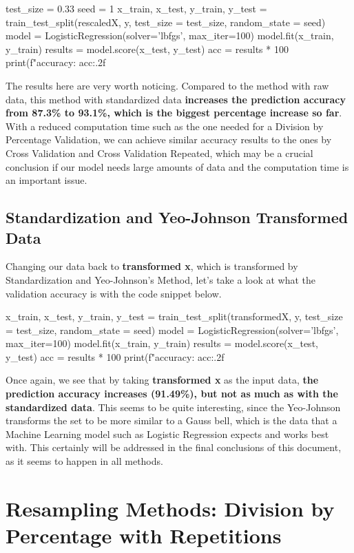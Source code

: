 \documentclass[11pt]{article}
\begin{document}
\begin{python}
test_size = 0.33
seed = 1
x_train, x_test, y_train, y_test = train_test_split(rescaledX, y, test_size = test_size, random_state = seed)
model = LogisticRegression(solver='lbfgs', max_iter=100)
model.fit(x_train, y_train)
results = model.score(x_test, y_test)
acc = results * 100
print(f"accuracy: {acc:.2f}%
\end{python}

The results here are very worth noticing. Compared to the method with raw data, this method with standardized data \textbf{increases the prediction accuracy from 87.3\% to 93.1\%, which is the biggest percentage increase so far}. With a reduced computation time such as the one needed for a Division by Percentage Validation, we can achieve similar accuracy results to the ones by Cross Validation and Cross Validation Repeated, which may be a crucial conclusion if our model needs large amounts of data and the computation time is an important issue.

\subsection{Standardization and Yeo-Johnson Transformed Data}

Changing our data back to \textbf{transformed x}, which is transformed by Standardization and Yeo-Johnson's Method, let's take a look at what the validation accuracy is with the code snippet below.
\\

\begin{python}
x_train, x_test, y_train, y_test = train_test_split(transformedX, y, test_size = test_size, random_state = seed)
model = LogisticRegression(solver='lbfgs', max_iter=100)
model.fit(x_train, y_train)
results = model.score(x_test, y_test)
acc = results * 100
print(f"accuracy: {acc:.2f}%
\end{python}

Once again, we see that by taking \textbf{transformed x} as the input data, \textbf{the prediction accuracy increases (91.49\%), but not as much as with the standardized data}. This seems to be quite interesting, since the Yeo-Johnson transforms the set to be more similar to a Gauss bell, which is the data that a Machine Learning model such as Logistic Regression expects and works best with. This certainly will be addressed in the final conclusions of this document, as it seems to happen in all methods.

\section{Resampling Methods: Division by Percentage with Repetitions}
\end{document}
